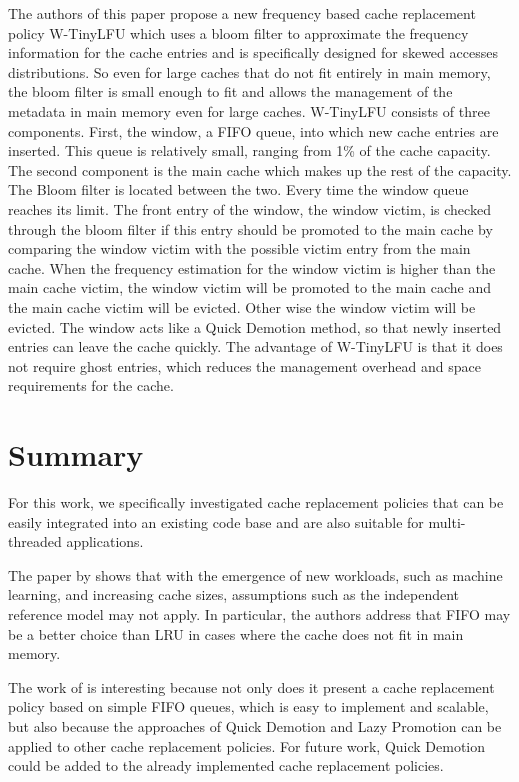 \documentclass[
	12pt,
	a4paper,
	abstract,
	bibliography=totoc,
	chapterprefix,
	headings=openright,
	numbers=endperiod,
	parskip=half,
	twoside,
]{scrreprt}
\begin{document}
The authors of this paper propose a new frequency based cache replacement policy W-TinyLFU which uses a bloom filter to 
approximate the frequency information for the cache entries and is specifically designed for skewed accesses distributions.
So even for large caches that do not fit entirely in main memory, the bloom filter is small enough to fit and allows the 
management of the metadata in main memory even for large caches.
W-TinyLFU consists of three components.
First, the window, a FIFO queue, into which new cache entries are inserted.
This queue is relatively small, ranging from 1\% of the cache capacity.
The second component is the main cache which makes up the rest of the capacity.
The Bloom filter is located between the two.
Every time the window queue reaches its limit.
The front entry of the window, the window victim, is checked through the bloom filter
if this entry should be promoted to the main cache by comparing the window victim with the 
possible victim entry from the main cache.
When the frequency estimation for the window victim is higher than the main cache victim,
the window victim will be promoted to the main cache and the main cache victim will be evicted.
Other wise the window victim will be evicted. 
The window acts like a Quick Demotion method, so that newly inserted entries can leave the cache quickly.
The advantage of W-TinyLFU is that it does not require ghost entries, which reduces the management overhead and space requirements 
for the cache.

\section*{Summary}

For this work, we specifically investigated cache replacement policies that 
can be easily integrated into an existing code base and are also suitable 
for multi-threaded applications.

The paper by \cite{eytan2020s} shows that with the emergence of new workloads, such as machine learning, and 
increasing cache sizes, assumptions such as the independent reference model may not apply.
In particular, the authors address that FIFO may be a better choice than LRU in cases where the cache does not fit in main memory.

The work of \cite{yang2023fifo} is interesting because not only does it present a cache replacement policy based on simple FIFO queues, 
which is easy to implement and scalable, but also because the approaches of Quick Demotion and Lazy Promotion 
can be applied to other cache replacement policies.
For future work, Quick Demotion could be added to the already implemented cache replacement policies.
\end{document}
